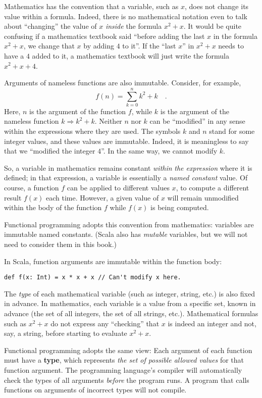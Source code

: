Mathematics has the convention that a variable, such as $x$, does
not change its value within a formula. Indeed, there is no mathematical
notation even to talk about ``changing'' the value of $x$ \emph{inside}
the formula $x^{2}+x$. It would be quite confusing if a mathematics
textbook said ``before adding the last $x$ in the formula $x^{2}+x$,
we change that $x$ by adding $4$ to it''. If the ``last $x$''
in $x^{2}+x$ needs to have a $4$ added to it, a mathematics textbook
will just write the formula $x^{2}+x+4$.

Arguments of nameless functions are also immutable. Consider, for
example,
\[
f(n)=\sum_{k=0}^{n}k^{2}+k\quad.
\]
Here, $n$ is the argument of the function $f$, while $k$ is the
argument of the nameless function $k\Rightarrow k^{2}+k$. Neither
$n$ nor $k$ can be ``modified'' in any sense within the expressions
where they are used. The symbols $k$ and $n$ stand for some integer
values, and these values are immutable. Indeed, it is meaningless
to say that we ``modified the integer $4$''. In the same way, we
cannot modify $k$.

So, a variable in mathematics remains constant \emph{within} \emph{the
expression} where it is defined; in that expression, a variable is
essentially a \emph{named constant} value. Of course, a function $f$
can be applied to different values $x$, to compute a different result
$f(x)$ each time. However, a given value of $x$ will remain unmodified
within the body of the function $f$ while $f(x)$ is being computed.

Functional programming adopts this convention from mathematics: variables
are immutable named constants. (Scala also has \emph{mutable} variables,
but we will not need to consider them in this book.)

In Scala, function arguments are immutable within the function body:
\begin{lstlisting}
def f(x: Int) = x * x + x // Can't modify x here.
\end{lstlisting}

The \emph{type} of each mathematical variable (such as integer, string,
etc.) is also fixed in advance. In mathematics, each variable is a
value from a specific set, known in advance (the set of all integers,
the set of all strings, etc.). Mathematical formulas such as $x^{2}+x$
do not express any ``checking'' that $x$ is indeed an integer and
not, say, a string, before starting to evaluate $x^{2}+x$.

Functional programming adopts the same view: Each argument of each
function must have a \textbf{type}, which represents
\emph{the set of possible allowed values} for that function argument.
The programming language's compiler will automatically check the types
of all arguments \emph{before} the program runs. A program that calls
functions on arguments of incorrect types will not compile.

